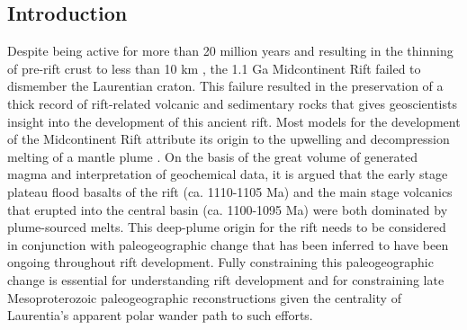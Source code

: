 \documentclass[draft,gc]{AGUTeX}
\begin{document}
\begin{article}

%
%

\section{Introduction}
Despite being active for more than 20 million years \citep{Davis1997a} and resulting in the thinning of pre-rift crust to less than 10 km \citep{Cannon1992b}, the 1.1 Ga Midcontinent Rift failed to dismember the Laurentian craton. This failure resulted in the preservation of a thick record of rift-related volcanic and sedimentary rocks that gives geoscientists insight into the development of this ancient rift. Most models for the development of the Midcontinent Rift attribute its origin to the upwelling and decompression melting of a mantle plume \citep{Shirey1997a}. On the basis of the great volume of generated magma and interpretation of geochemical data, it is argued that the early stage plateau flood basalts of the rift (ca. 1110-1105 Ma) and the main stage volcanics that erupted into the central basin (ca. 1100-1095 Ma) were both dominated by plume-sourced melts. This deep-plume origin for the rift needs to be considered in conjunction with paleogeographic change that has been inferred to have been ongoing throughout rift development. Fully constraining this paleogeographic change is essential for understanding rift development and for constraining late Mesoproterozoic paleogeographic reconstructions given the centrality of Laurentia's apparent polar wander path to such efforts.


\end{article}
\end{document}

